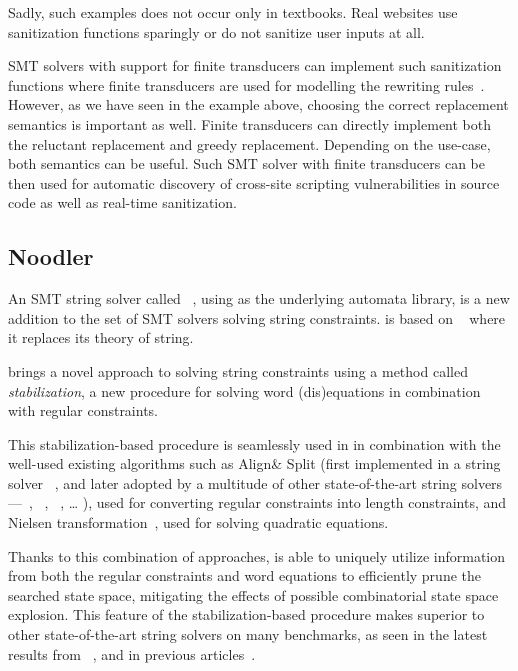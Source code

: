 Sadly, such examples does not occur only in textbooks. Real websites use sanitization functions sparingly or do not sanitize user inputs at all.

SMT solvers with support for finite transducers can implement such sanitization functions where finite transducers are used for modelling the rewriting rules~\cite{rewriting_rules_kaplan94, rewriting_rules_karttunen97}.
However, as we have seen in the example above, choosing the correct replacement semantics is important as well.
Finite transducers can directly implement both the reluctant replacement and greedy replacement.
Depending on the use-case, both semantics can be useful.
Such SMT solver with finite transducers can be then used for automatic discovery of cross-site scripting vulnerabilities in source code as well as real-time sanitization.

\subsection{Noodler}

An SMT string solver called \noodler~\cite{fm23_equations_synergy_regular_constraints_DBLP:conf/fm/BlahoudekCCHHLS23, oopsla23_stabilization_DBLP:journals/pacmpl/ChenCHHLS23,tacas24_noodler_10.1007/978-3-031-57246-3_2}, using \mata as the underlying automata library, is a new addition to the set of SMT solvers solving string constraints.
\noodler is based on \ziii~\cite{z3} where it replaces its theory of string.

\noodler brings a novel approach to solving string constraints using a method called \emph{stabilization}, a new procedure for solving word (dis)equations in combination with regular constraints.

This stabilization-based procedure is seamlessly used in \noodler in combination with the well-used existing algorithms such as
Align\& Split (first implemented in a string solver \norn~\cite{Norn,AutomataSplitting}, and later adopted by a multitude of other state-of-the-art string solvers---\ostrich~\cite{AnthonyTowards2016,AnthonyReplaceAll2018,AnthonyComplex2019,AnthonyRegex2022,AnthonyInteger2020},
\ziiistriiire~\cite{Z3str3RE,BerzishDGKMMN23}, \sloth~\cite{holik_string_2018}, \ldots
), used for converting regular constraints into length constraints, and
Nielsen transformation~\cite{nielsen1917}, used for solving quadratic equations.

Thanks to this combination of approaches, \noodler is able to uniquely utilize information from both the regular constraints and word equations to efficiently prune the searched state space, mitigating the effects of possible combinatorial state space explosion.
This feature of the stabilization-based procedure makes \noodler superior to other state-of-the-art string solvers on many benchmarks, as seen in the latest results from \noodler~\cite{tacas24_noodler_10.1007/978-3-031-57246-3_2}, and in previous articles~\cite{fm23_equations_synergy_regular_constraints_DBLP:conf/fm/BlahoudekCCHHLS23, oopsla23_stabilization_DBLP:journals/pacmpl/ChenCHHLS23}.

